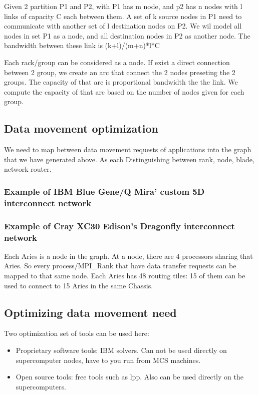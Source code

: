 \documentclass[letter]{article}
\begin{document}
Given 2 partition P1 and P2, with P1 has m node, and p2 has n nodes with l links of capacity C each between them. A set of k source nodes in P1 need to communicate with another set of l destination nodes on P2. We wil model all nodes in set P1 as a node, and all destination nodes in P2 as another node. The bandwidth between these link is (k+l)/(m+n)*l*C

Each rack/group can be considered as a node. If exist a direct connection between 2 group, we create an arc that connect the 2 nodes preseting the 2 groups. The capacity of that arc is proportional bandwidth the the link. We compute the capacity of that arc based on the number of nodes given for each group.

\subsection{Data movement optimization}
We need to map between data movement requests of applications into the graph that we have generated above. As each 
Distinguishing between rank, node, blade, network router.

\subsubsection{Example of IBM Blue Gene/Q Mira' custom 5D interconnect network}

\subsubsection{Example of Cray XC30 Edison's Dragonfly interconnect network}

Each Aries is a node in the graph. At a node, there are 4 processors sharing that Aries. So every process/MPI\_Rank that have data transfer requests can be mapped to that same node. Each Aries has 48 routing tiles: 15 of them can be used to connect to 15 Aries in the same Chassis. 

\subsection {Optimizing data movement need}
Two optimization set of tools can be used here:
\begin{itemize}
\item Proprietary software tools: IBM solvers. Can not be used directly on supercomputer nodes, have to you run from MCS machines.
\item Open source tools: free tools such as lpp. Also can be used directly on the supercomputers.
\end{itemize}
\end{document}
